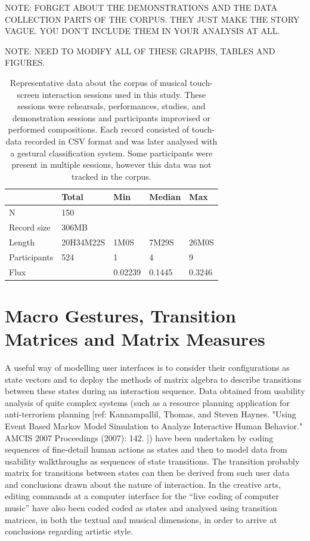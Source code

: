 \documentclass{sigchi}
\begin{document}
NOTE: FORGET ABOUT THE DEMONSTRATIONS AND THE DATA COLLECTION PARTS OF THE CORPUS. THEY JUST MAKE THE STORY VAGUE. YOU DON'T INCLUDE THEM IN YOUR ANALYSIS AT ALL.

NOTE: NEED TO MODIFY ALL OF THESE GRAPHS, TABLES AND FIGURES.




\begin{table}
\begin{tabular}{l|llll}
\hline
            & Total & Min  & Median   & Max     \\ 
\hline
N           & 150       &         &        &  \\
Record size & 306MB     &         &        &   \\
Length      & 20H34M22S & 1M0S    & 7M29S  & 26M0S\\
Participants& 524       & 1       & 4      & 9    \\
Flux        &           & 0.02239 & 0.1445 & 0.3246\\
\hline
\end{tabular}
\caption{
  Representative data about the corpus of musical touch-screen
  interaction sessions used in this study. These sessions were
  rehearsals, performances, studies, and demonstration sessions and 
  participants improvised or performed compositions. Each record
  consisted of touch-data recorded in CSV format and was later analysed
  with a gestural classification system. Some participants were
  present in multiple sessions, however this data was not tracked in
  the corpus.\label{corpus-table}}
\end{table}



\section{Macro Gestures, Transition Matrices and Matrix Measures}



A useful way of modelling user interfaces is to consider their configurations as state vectors and to deploy the methods of matrix algebra to describe transitions between these states during an interaction sequence\cite{Thimbleby:2001kq, Thimbleby:2004fj}. Data obtained from usability analysis of quite complex systems (such as a resource planning application for anti-terrorism planning [ref: Kannampallil, Thomas, and Steven Haynes. "Using Event Based Markov Model Simulation to Analyze Interactive Human Behavior." AMCIS 2007 Proceedings (2007): 142. ]) have been undertaken by coding sequences of fine-detail human actions as states and then to model data from usability walkthroughs as sequences of state transitions. The transition probably matrix for transitions between states can then be derived from such user data and conclusions drawn about the nature of interaction. In the creative arts, editing commands at a computer interface for the ``live coding of computer music'' have also been coded coded as states and analysed using transition matrices, in both the textual and musical dimensions, in order to arrive at conclusions regarding artistic style\cite{Swift:2014tya}.
\end{document}
